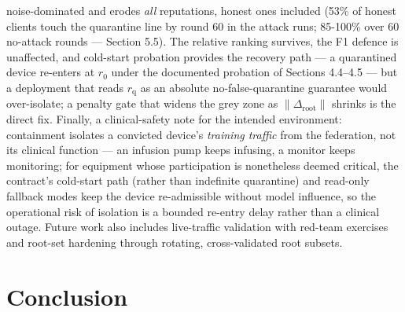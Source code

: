 \documentclass[cmc,article,submit,moreauthors,pdftex]{Definitions/tsp}
\begin{document}
noise-dominated and erodes \emph{all} reputations, honest ones included (53\% of honest clients touch the quarantine line by round 60 in the attack runs; 85-100\% over 60 no-attack rounds --- Section 5.5). The relative ranking survives, the F1 defence is unaffected, and cold-start probation provides the recovery path --- a quarantined device re-enters at $r_0$ under the documented probation of Sections 4.4--4.5 --- but a deployment that reads $r_{\mathrm{q}}$ as an absolute no-false-quarantine guarantee would over-isolate; a penalty gate that widens the grey zone as $\|\Delta_{\mathrm{root}}\|$ shrinks is the direct fix. Finally, a clinical-safety note for the intended environment: containment isolates a convicted device's \emph{training traffic} from the federation, not its clinical function --- an infusion pump keeps infusing, a monitor keeps monitoring; for equipment whose participation is nonetheless deemed critical, the contract's cold-start path (rather than indefinite quarantine) and read-only fallback modes keep the device re-admissible without model influence, so the operational risk of isolation is a bounded re-entry delay rather than a clinical outage. Future work also includes live-traffic validation with red-team exercises and root-set hardening through rotating, cross-validated root subsets.

\section{Conclusion}\label{sec:conclusion}
\end{document}
